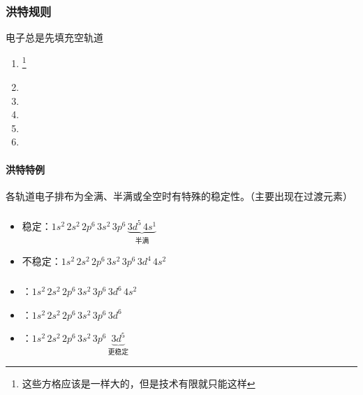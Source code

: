 \documentclass[a4paper]{article}
\begin{document}
	\subsubsection{洪特规则}
	电子总是先填充空轨道
	\begin{enumerate}
		\item \fbox{$\uparrow\ $}\fbox{$\ \ $}\fbox{$\ \ $}\footnote{这些方格应该是一样大的，但是技术有限就只能这样}
		\item \fbox{$\uparrow\ $}\fbox{$\uparrow\ $}\fbox{$\ \ $}
		\item \fbox{$\uparrow\ $}\fbox{$\uparrow\ $}\fbox{$\uparrow\ $}
		\item \fbox{$\uparrow\downarrow$}\fbox{$\uparrow\ $}\fbox{$\uparrow\ $}
		\item \fbox{$\uparrow\downarrow$}\fbox{$\uparrow\downarrow$}\fbox{$\uparrow\ $}
		\item \fbox{$\uparrow\downarrow$}\fbox{$\uparrow\downarrow$}\fbox{$\uparrow\downarrow$}
	\end{enumerate}
	\paragraph{洪特特例}
	各轨道电子排布为全满、半满或全空时有特殊的稳定性。（主要出现在过渡元素）
	\subparagraph{}
	\begin{itemize}
		\item 稳定：$1s^2\,2s^2\,2p^6\,3s^2\,3p^6\,\underbrace{3d^5\,4s^1}_{半满}$
		\item 不稳定：$1s^2\,2s^2\,2p^6\,3s^2\,3p^6\,3d^4\,4s^2$
	\end{itemize}
	\vskip 10mm
	\subparagraph{}
	\begin{itemize}
		\item {}：$1s^2\,2s^2\,2p^6\,3s^2\,3p^6\,3d^6\,4s^2$
		\item {}：$1s^2\,2s^2\,2p^6\,3s^2\,3p^6\,3d^6$
		\item {}：$1s^2\,2s^2\,2p^6\,3s^2\,3p^6\,\underbrace{3d^5}_{更稳定}$
	\end{itemize}
\end{document}
